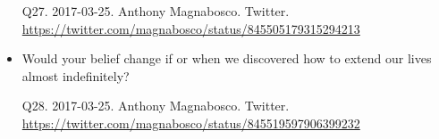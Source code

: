 \documentclass[a4paper]{scrartcl}
\begin{document}
\begin{itemize}
                \begin{tiny}
                    Q27.
                    2017-03-25.
                    Anthony Magnabosco.
                        Twitter.
                        \\
                        \url{ https://twitter.com/magnabosco/status/845505179315294213 }
                    \par
                \end{tiny}
                    \item Would your belief change if or when we discovered how to extend our lives almost indefinitely?
                    
                \begin{tiny}
                    Q28.
                    2017-03-25.
                    Anthony Magnabosco.
                        Twitter.
                        \\
                        \url{ https://twitter.com/magnabosco/status/845519597906399232 }
                    \par
                \end{tiny}
        \end{itemize}
\end{document}
